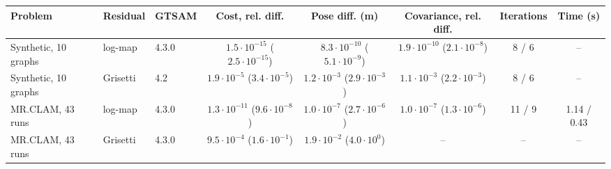 \begin{tabular}{@{}lllccccc@{}}
\toprule
Problem & Residual & GTSAM & Cost, rel. diff. & Pose diff. (m) & Covariance, rel. diff. & Iterations & Time (s) \\
\midrule
Synthetic, 10 graphs & log-map & 4.3.0 & $1.5{\cdot}10^{-15}$ ($2.5{\cdot}10^{-15}$) & $8.3{\cdot}10^{-10}$ ($5.1{\cdot}10^{-9}$) & $1.9{\cdot}10^{-10}$ ($2.1{\cdot}10^{-8}$) & 8 / 6 & -- \\
Synthetic, 10 graphs & Grisetti & 4.2 & $1.9{\cdot}10^{-5}$ ($3.4{\cdot}10^{-5}$) & $1.2{\cdot}10^{-3}$ ($2.9{\cdot}10^{-3}$) & $1.1{\cdot}10^{-3}$ ($2.2{\cdot}10^{-3}$) & 8 / 6 & -- \\
MR.CLAM, 43 runs & log-map & 4.3.0 & $1.3{\cdot}10^{-11}$ ($9.6{\cdot}10^{-8}$) & $1.0{\cdot}10^{-7}$ ($2.7{\cdot}10^{-6}$) & $1.0{\cdot}10^{-7}$ ($1.3{\cdot}10^{-6}$) & 11 / 9 & 1.14 / 0.43 \\
MR.CLAM, 43 runs & Grisetti & 4.3.0 & $9.5{\cdot}10^{-4}$ ($1.6{\cdot}10^{-1}$) & $1.9{\cdot}10^{-2}$ ($4.0{\cdot}10^{0}$) & -- & -- & -- \\
\bottomrule
\end{tabular}
